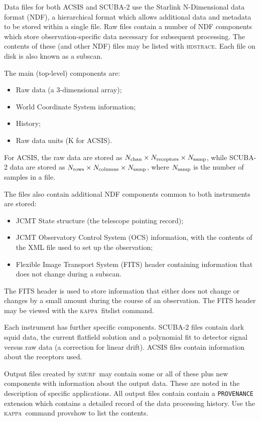 \documentclass[twoside,11pt]{article}
\newcommand{\xref}[3]{#1}
\renewcommand{\_}{\texttt{\symbol{95}}}
\newcommand{\HDSTRACE}{\textsc{hdstrace}}
\newcommand{\HDSTRACEref}{\xref{\HDSTRACE}{sun102}{}}
\newcommand{\KAPPA}{\textsc{kappa}}
\newcommand{\SMURF}{\textsc{smurf}}
\newcommand{\ndf}{\xref{NDF}{sun33}{}}
\begin{document}
Data files for both ACSIS and SCUBA-2 use the Starlink N-Dimensional
data format (\ndf), a hierarchical format which allows
additional data and metadata to be stored within a single file. Raw
files contain a number of NDF components which store
observation-specific data necessary for subsequent processing. The
contents of these (and other NDF) files may be listed with
\HDSTRACEref. Each file on disk is also known as a subscan.

The main (top-level) components are:
\begin{itemize}
\item Raw data (a 3-dimensional array);
\item World Coordinate System information;
\item History;
\item Raw data units (K for ACSIS).
\end{itemize}
For ACSIS, the raw data are stored as $N_{\rm chan} \times N_{\rm
  receptors} \times N_{\rm samp}$, while SCUBA-2 data are stored as
$N_{\rm rows} \times N_{\rm columns} \times N_{\rm samp}$, where
$N_{\rm samp}$ is the number of samples in a file.

The files also contain additional NDF components common to both
instruments are stored:
\begin{itemize}
\item JCMT State structure (the telescope pointing record);
\item JCMT Observatory Control System (OCS) information, with the
  contents of the XML file used to set up the observation;
\item Flexible Image Transport System (FITS) header containing
  information that does not change during a subscan.
\end{itemize}
The FITS header is used to store information that either does not
change or changes by a small amount during the course of an
observation. The FITS header may be viewed with the \KAPPA\ fitslist
command.

Each instrument has further specific components. SCUBA-2 files contain
dark squid data, the current flatfield solution and a polynomial fit
to detector signal versus raw data (a correction for linear drift).
ACSIS files contain information about the receptors used.

Output files created by \SMURF\ may contain some or all of these plus
new components with information about the output data. These are noted
in the description of specific applications. All output files contain
contain a \texttt{PROVENANCE} extension which contains a detailed
record of the data processing history. Use the \KAPPA\ command
provshow to list the contents.
\end{document}
